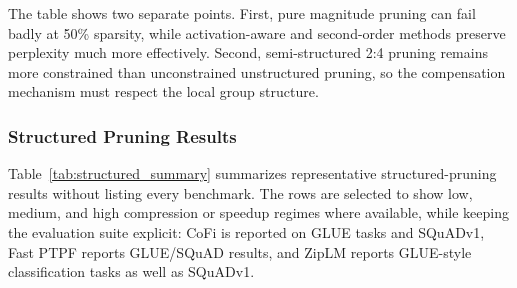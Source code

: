 The table shows two separate points. First, pure magnitude pruning can fail badly at 50\% sparsity, while activation-aware and second-order methods preserve perplexity much more effectively. Second, semi-structured 2:4 pruning remains more constrained than unconstrained unstructured pruning, so the compensation mechanism must respect the local group structure.

\subsubsection{Structured Pruning Results}

Table~\ref{tab:structured_summary} summarizes representative structured-pruning results without listing every benchmark. The rows are selected to show low, medium, and high compression or speedup regimes where available, while keeping the evaluation suite explicit: CoFi is reported on GLUE tasks and SQuADv1, Fast PTPF reports GLUE/SQuAD results, and ZipLM reports GLUE-style classification tasks as well as SQuADv1.

